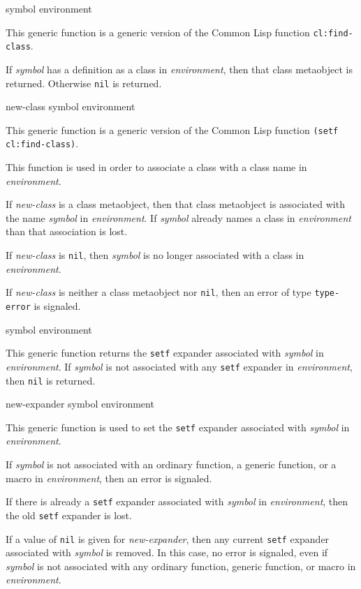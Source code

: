  {symbol environment}

This generic function is a generic version of the Common Lisp function
\texttt{cl:find-class}.

If \textit{symbol} has a definition as a class in
\textit{environment}, then that class metaobject is returned.
Otherwise \texttt{nil} is returned.

 {new-class symbol environment}

This generic function is a generic version of the Common Lisp function
\texttt{(setf cl:find-class)}.

This function is used in order to associate a class with a class name
in \textit{environment}.

If \textit{new-class} is a class metaobject, then that class
metaobject is associated with the name \textit{symbol} in
\textit{environment}.  If \textit{symbol} already names a class in
\textit{environment} than that association is lost.

If \textit{new-class} is \texttt{nil}, then \textit{symbol} is no
longer associated with a class in \textit{environment}.

If \textit{new-class} is neither a class metaobject nor \texttt{nil},
then an error of type \texttt{type-error} is signaled.

 {symbol environment}

This generic function returns the \texttt{setf} expander associated
with \textit{symbol} in \textit{environment}.  If \textit{symbol} is
not associated with any \texttt{setf} expander in
\textit{environment}, then \texttt{nil} is returned.

 {new-expander symbol environment}

This generic function is used to set the \texttt{setf} expander
associated with \textit{symbol} in \textit{environment}.

If \textit{symbol} is not associated with an ordinary function, a
generic function, or a macro in \textit{environment}, then an error is
signaled.

If there is already a \texttt{setf} expander associated with
\textit{symbol} in \textit{environment}, then the old \texttt{setf}
expander is lost.

If a value of \texttt{nil} is given for \textit{new-expander}, then
any current \texttt{setf} expander associated with \textit{symbol} is
removed.  In this case, no error is signaled, even if \textit{symbol}
is not associated with any ordinary function, generic function, or
macro in \textit{environment}.

